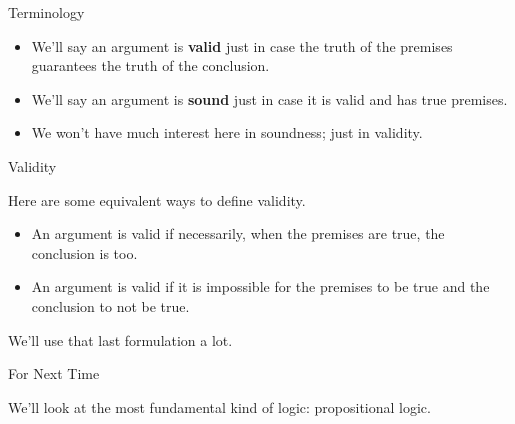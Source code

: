 \documentclass[
  ignorenonframetext,
]{beamer}
\providecommand{\tightlist}{%
  \setlength{\itemsep}{0pt}\setlength{\parskip}{0pt}}
\renewcommand{\,}{\text{, }}
\begin{document}
\begin{frame}{Terminology}
\protect\hypertarget{terminology}{}

\begin{itemize}
\tightlist
\item
  We'll say an argument is \textbf{valid} just in case the truth of the
  premises guarantees the truth of the conclusion.
\item
  We'll say an argument is \textbf{sound} just in case it is valid and
  has true premises.
\item
  We won't have much interest here in soundness; just in validity.
\end{itemize}

\end{frame}

\begin{frame}{Validity}
\protect\hypertarget{validity}{}

Here are some equivalent ways to define validity.

\begin{itemize}
\tightlist
\item
  An argument is valid if necessarily, when the premises are true, the
  conclusion is too.
\item
  An argument is valid if it is impossible for the premises to be true
  and the conclusion to not be true.
\end{itemize}

We'll use that last formulation a lot.

\end{frame}

\begin{frame}{For Next Time}
\protect\hypertarget{for-next-time}{}

We'll look at the most fundamental kind of logic: propositional logic.

\end{frame}
\end{document}
